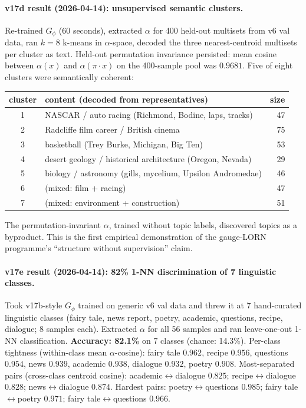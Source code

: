 \documentclass[11pt, a4paper]{article}
\theoremstyle{plain}
\theoremstyle{definition}
\theoremstyle{remark}
\begin{document}
\paragraph{v17d result (2026-04-14): unsupervised semantic clusters.}
Re-trained $G_\phi$ (60 seconds), extracted $\alpha$ for 400 held-out multisets from v6 val data, ran $k{=}8$ k-means in $\alpha$-space, decoded the three nearest-centroid multisets per cluster as text.
Held-out permutation invariance persisted: mean cosine between $\alpha(x)$ and $\alpha(\pi \cdot x)$ on the 400-sample pool was $0.9681$.
Five of eight clusters were semantically coherent:
\begin{center}
\small
\begin{tabular}{clr}
\toprule
cluster & content (decoded from representatives) & size \\
\midrule
1 & NASCAR / auto racing (Richmond, Bodine, laps, tracks) & 47 \\
2 & Radcliffe film career / British cinema & 75 \\
3 & basketball (Trey Burke, Michigan, Big Ten) & 53 \\
4 & desert geology / historical architecture (Oregon, Nevada) & 29 \\
5 & biology / astronomy (gills, mycelium, Upsilon Andromedae) & 46 \\
6 & (mixed: film + racing) & 47 \\
7 & (mixed: environment + construction) & 51 \\
\bottomrule
\end{tabular}
\end{center}
The permutation-invariant $\alpha$, trained without topic labels, discovered topics as a byproduct.
This is the first empirical demonstration of the gauge-LORN programme's ``structure without supervision'' claim.

\paragraph{v17e result (2026-04-14): 82\% 1-NN discrimination of 7 linguistic classes.}
Took v17b-style $G_\phi$ trained on generic v6 val data and threw it at 7 hand-curated linguistic classes (fairy tale, news report, poetry, academic, questions, recipe, dialogue; 8 samples each).
Extracted $\alpha$ for all 56 samples and ran leave-one-out 1-NN classification.
\textbf{Accuracy: 82.1\%} on 7 classes (chance: 14.3\%).
Per-class tightness (within-class mean $\alpha$-cosine): fairy tale $0.962$, recipe $0.956$, questions $0.954$, news $0.939$, academic $0.938$, dialogue $0.932$, poetry $0.908$.
Most-separated pairs (cross-class centroid cosine): academic$\leftrightarrow$dialogue $0.825$; recipe$\leftrightarrow$dialogue $0.828$; news$\leftrightarrow$dialogue $0.874$.
Hardest pairs: poetry$\leftrightarrow$questions $0.985$; fairy tale$\leftrightarrow$poetry $0.971$; fairy tale$\leftrightarrow$questions $0.966$.
\end{document}
